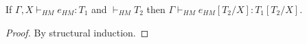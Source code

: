 \begin{lemma}
\label{tes}
\onehalfspacing
If $\Gamma,X\vdash_{HM}e_{HM}:T_{1}$ and $\vdash_{HM}T_{2}$ then $\Gamma\vdash_{HM}e_{HM}[T_{2}/X]:T_{1}[T_{2}/X]$.
\begin{proof}
By structural induction.
\end{proof}
\end{lemma}